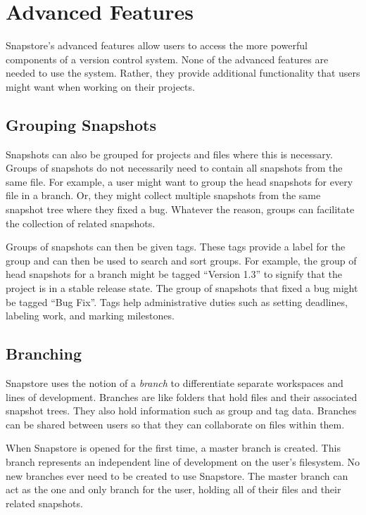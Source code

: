 \section{Advanced Features}

Snapstore's advanced features allow users to access the more powerful components of a version control system. None of the advanced features are needed to use the system. Rather, they provide additional functionality that users might want when working on their projects.

\subsection{Grouping Snapshots}

Snapshots can also be grouped for projects and files where this is necessary. Groups of snapshots do not necessarily need to contain all snapshots from the same file. For example, a user might want to group the head snapshots for every file in a branch. Or, they might collect multiple snapshots from the same snapshot tree where they fixed a bug. Whatever the reason, groups can facilitate the collection of related snapshots.

Groups of snapshots can then be given tags. These tags provide a label for the group and can then be used to search and sort groups. For example, the group of head snapshots for a branch might be tagged ``Version 1.3'' to signify that the project is in a stable release state. The group of snapshots that fixed a bug might be tagged ``Bug Fix''. Tags help administrative duties such as setting deadlines, labeling work, and marking milestones.

\subsection{Branching}

Snapstore uses the notion of a \textit{branch} to differentiate separate workspaces and lines of development. Branches are like folders that hold files and their associated snapshot trees. They also hold information such as group and tag data. Branches can be shared between users so that they can collaborate on files within them.

When Snapstore is opened for the first time, a master branch is created. This branch represents an independent line of development on the user's filesystem. No new branches ever need to be created to use Snapstore. The master branch can act as the one and only branch for the user, holding all of their files and their related snapshots. 

